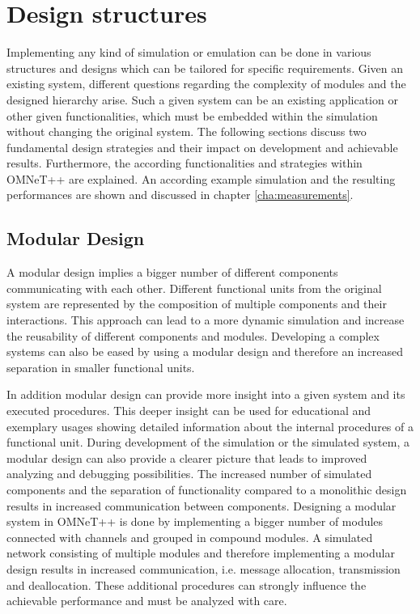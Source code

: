 \chapter{Design structures}
\label{cha:design}
Implementing any kind of simulation or emulation can be done in various structures and designs which can be tailored for specific requirements.
Given an existing system, different questions regarding the complexity of modules and the designed hierarchy arise.
Such a given system can be an existing application or other given functionalities, which must be embedded within the simulation without changing the original system.
The following sections discuss two fundamental design strategies and their impact on development and achievable results.
Furthermore, the according functionalities and strategies within OMNeT++ are explained.
An according example simulation and the resulting performances are shown and discussed in chapter \ref{cha:measurements}.

\section{Modular Design}
\label{sec:design_modular}
A modular design implies a bigger number of different components communicating with each other.
Different functional units from the original system are represented by the composition of multiple components and their interactions.
This approach can lead to a more dynamic simulation and increase the reusability of different components and modules.
Developing a complex systems can also be eased by using a modular design and therefore an increased separation in smaller functional units.

In addition modular design can provide more insight into a given system and its executed procedures.
This deeper insight can be used for educational and exemplary usages showing detailed information about the internal procedures of a functional unit.
During development of the simulation or the simulated system, a modular design can also provide a clearer picture that leads to improved analyzing and debugging possibilities.
The increased number of simulated components and the separation of functionality compared to a monolithic design results in increased communication between components.
Designing a modular system in OMNeT++ is done by implementing a bigger number of modules connected with channels and grouped in compound modules.
A simulated network consisting of multiple modules and therefore implementing a modular design results in increased communication, i.e. message allocation, transmission and deallocation.
These additional procedures can strongly influence the achievable performance and must be analyzed with care.

